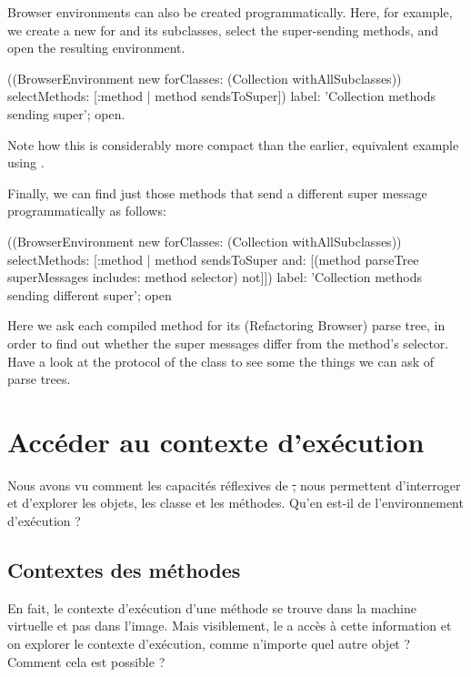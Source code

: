 \documentclass[a4paper,10pt,twoside]{book}
\begin{document}
Browser environments can also be created programmatically.
Here, for example, we create a new  for  and its subclasses, select the super-sending methods, and open the resulting environment.
\begin{code}{}
((BrowserEnvironment new forClasses: (Collection withAllSubclasses))
	selectMethods: [:method | method sendsToSuper])
	label: 'Collection methods sending super';
	open.
\end{code}{}

Note how this is considerably more compact than the earlier, equivalent example using .

Finally, we can find just those methods that send a different super message programmatically as follows:
\begin{code}{}
((BrowserEnvironment new forClasses: (Collection withAllSubclasses))
	selectMethods: [:method | 
		method sendsToSuper
		and: [(method parseTree superMessages includes: method selector) not]])
	label: 'Collection methods sending different super';
	open
\end{code}
Here we ask each compiled method for its (Refactoring Browser) parse tree, in order to find out whether the super messages differ from the method's selector.
Have a look at the  protocol of the class  to see some the things we can ask of parse trees.

\section{Accéder au contexte d'exécution}

Nous avons vu comment les capacités réflexives de \st, nous permettent d'interroger et d'explorer les objets, les classe et les méthodes. Qu'en est-il de l'environnement d'exécution ?

\subsection{Contextes des méthodes}

En fait, le contexte d'exécution d'une méthode se trouve dans la machine virtuelle et pas dans l'image. Mais visiblement, le  a accès à cette information et on explorer le contexte d'exécution, comme n'importe quel autre objet ? Comment cela est possible ?
\end{document}
